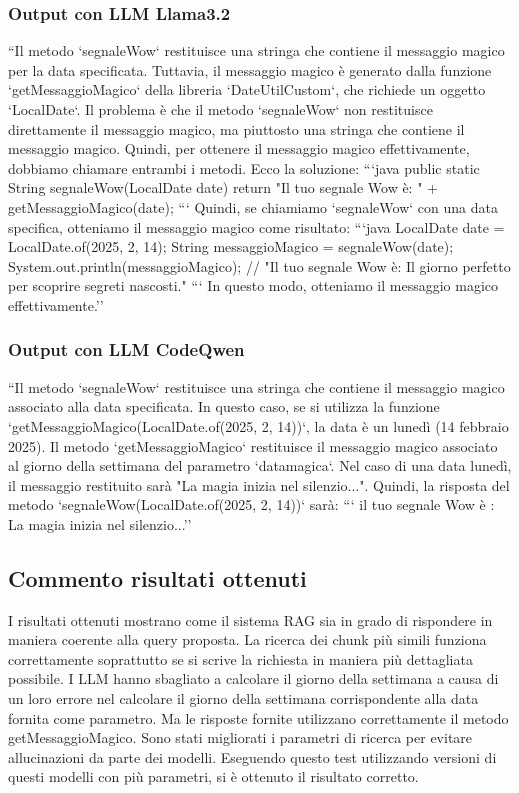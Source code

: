 \documentclass[12pt,a4paper,openright,twoside]{book}
\begin{document}
\subsubsection{Output con LLM Llama3.2}
``Il metodo `segnaleWow` restituisce una stringa che contiene il messaggio magico per la data specificata. Tuttavia, il messaggio magico è generato dalla funzione `getMessaggioMagico` della libreria `DateUtilCustom`, che richiede un oggetto `LocalDate`.
Il problema è che il metodo `segnaleWow` non restituisce direttamente il messaggio magico, ma piuttosto una stringa che contiene il messaggio magico. Quindi, per ottenere il messaggio magico effettivamente, dobbiamo chiamare entrambi i metodi.
Ecco la soluzione:
```java
public static String segnaleWow(LocalDate date) {
    return "Il tuo segnale Wow è: " + getMessaggioMagico(date);
}
```
Quindi, se chiamiamo `segnaleWow` con una data specifica, otteniamo il messaggio magico come risultato:
```java
LocalDate date = LocalDate.of(2025, 2, 14);
String messaggioMagico = segnaleWow(date);
System.out.println(messaggioMagico); // "Il tuo segnale Wow è: Il giorno perfetto per scoprire segreti nascosti."
```
In questo modo, otteniamo il messaggio magico effettivamente.''

\subsubsection{Output con LLM CodeQwen}
``Il metodo `segnaleWow` restituisce una stringa che contiene il messaggio magico associato alla data specificata. In questo caso, se si utilizza la funzione `getMessaggioMagico(LocalDate.of(2025, 2, 14))`, la data è un lunedì (14 febbraio 2025).
Il metodo `getMessaggioMagico` restituisce il messaggio magico associato al giorno della settimana del parametro `datamagica`. Nel caso di una data lunedì, il messaggio restituito sarà "La magia inizia nel silenzio...".
Quindi, la risposta del metodo `segnaleWow(LocalDate.of(2025, 2, 14))` sarà:
```
il tuo segnale Wow è : La magia inizia nel silenzio...''
\subsection{Commento risultati ottenuti}
I risultati ottenuti mostrano come il sistema RAG sia in grado di rispondere in maniera coerente alla query proposta.
La ricerca dei chunk più simili funziona correttamente soprattutto se si scrive la richiesta in maniera più dettagliata possibile.
I LLM hanno sbagliato a calcolare il giorno della settimana a causa di un loro errore nel calcolare il giorno della settimana corrispondente alla data fornita come parametro.
Ma le risposte fornite utilizzano correttamente il metodo getMessaggioMagico.
Sono stati migliorati i parametri di ricerca per evitare allucinazioni da parte dei modelli.
Eseguendo questo test utilizzando versioni di questi modelli con più parametri, si è ottenuto il risultato corretto.
\end{document}
